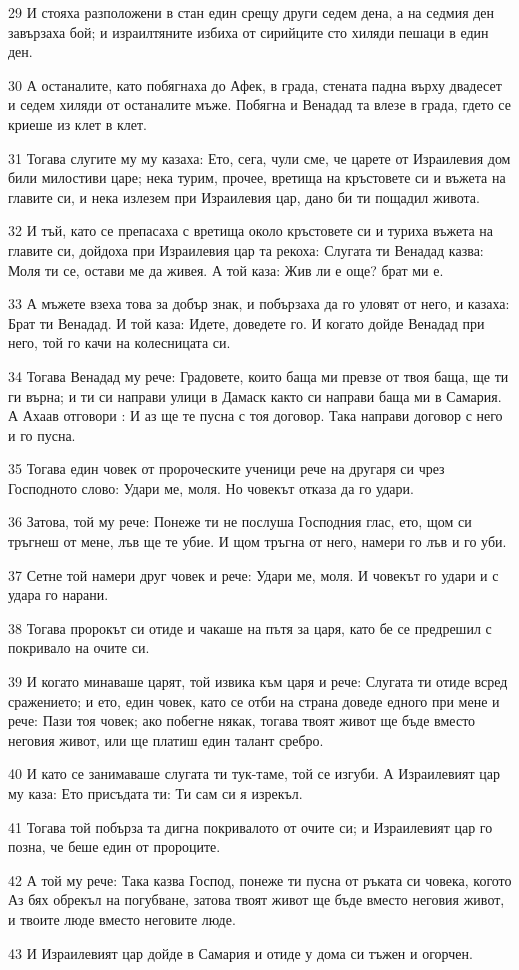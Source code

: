 \par 29 И стояха разположени в стан един срещу други седем дена, а на седмия ден завързаха бой; и израилтяните избиха от сирийците сто хиляди пешаци в един ден.
\par 30 А останалите, като побягнаха до Афек, в града, стената падна върху двадесет и седем хиляди от останалите мъже. Побягна и Венадад та влезе в града, гдето се криеше из клет в клет.
\par 31 Тогава слугите му му казаха: Ето, сега, чули сме, че царете от Израилевия дом били милостиви царе; нека турим, прочее, вретища на кръстовете си и въжета на главите си, и нека излезем при Израилевия цар, дано би ти пощадил живота.
\par 32 И тъй, като се препасаха с вретища около кръстовете си и туриха въжета на главите си, дойдоха при Израилевия цар та рекоха: Слугата ти Венадад казва: Моля ти се, остави ме да живея. А той каза: Жив ли е още? брат ми е.
\par 33 А мъжете взеха това за добър знак, и побързаха да го уловят от него, и казаха: Брат ти Венадад. И той каза: Идете, доведете го. И когато дойде Венадад при него, той го качи на колесницата си.
\par 34 Тогава Венадад му рече: Градовете, които баща ми превзе от твоя баща, ще ти ги върна; и ти си направи улици в Дамаск както си направи баща ми в Самария. А Ахаав отговори : И аз ще те пусна с тоя договор. Така направи договор с него и го пусна.
\par 35 Тогава един човек от пророческите ученици рече на другаря си чрез Господното слово: Удари ме, моля. Но човекът отказа да го удари.
\par 36 Затова, той му рече: Понеже ти не послуша Господния глас, ето, щом си тръгнеш от мене, лъв ще те убие. И щом тръгна от него, намери го лъв и го уби.
\par 37 Сетне той намери друг човек и рече: Удари ме, моля. И човекът го удари и с удара го нарани.
\par 38 Тогава пророкът си отиде и чакаше на пътя за царя, като бе се предрешил с покривало на очите си.
\par 39 И когато минаваше царят, той извика към царя и рече: Слугата ти отиде всред сражението; и ето, един човек, като се отби на страна доведе едного при мене и рече: Пази тоя човек; ако побегне някак, тогава твоят живот ще бъде вместо неговия живот, или ще платиш един талант сребро.
\par 40 И като се занимаваше слугата ти тук-таме, той се изгуби. А Израилевият цар му каза: Ето присъдата ти: Ти сам си я изрекъл.
\par 41 Тогава той побърза та дигна покривалото от очите си; и Израилевият цар го позна, че беше един от пророците.
\par 42 А той му рече: Така казва Господ, понеже ти пусна от ръката си човека, когото Аз бях обрекъл на погубване, затова твоят живот ще бъде вместо неговия живот, и твоите люде вместо неговите люде.
\par 43 И Израилевият цар дойде в Самария и отиде у дома си тъжен и огорчен.

